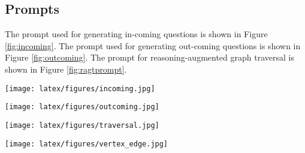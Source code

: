 \subsection{Prompts}
\label{prompt}
The prompt used for generating in-coming questions is shown in Figure \ref{fig:incoming}.  The prompt used for generating out-coming questions is shown in Figure \ref{fig:outcoming}. %
The prompt for reasoning-augmented graph traversal is shown in Figure \ref{fig:ragtprompt}. 
\begin{figure*}[t]
\centering
  \texttt{[image: latex/figures/incoming.jpg]}
  \caption{Prompt for generating in-coming questions.}
  \label{fig:incoming}
\end{figure*}
\begin{figure*}[t]
\centering
  \texttt{[image: latex/figures/outcoming.jpg]}
  \caption{Prompt for generating out-coming questions.}
  \label{fig:outcoming}
\end{figure*}

\begin{figure*}[ht]
\centering
{}
\caption{Demonstration of the traversal in the graph structure}\label{demo1}
\end{figure*}


\begin{figure*}[t]
\centering
  \texttt{[image: latex/figures/traversal.jpg]}
  \caption{Prompt for reasoning-augmented graph traversal.}
  \label{fig:ragtprompt}
\end{figure*}

\begin{figure*}[t]
\centering
  \texttt{[image: latex/figures/vertex\_edge.jpg]}
  \caption{Demonstration of one edge between two vertices.}
  \label{fig:vertex_edge}
\end{figure*}
